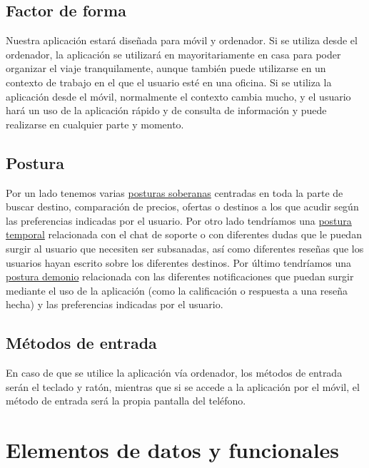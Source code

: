 \subsection{Factor de forma}
Nuestra aplicación estará diseñada para móvil y ordenador. Si se utiliza desde el ordenador, la aplicación se utilizará en mayoritariamente en casa para 
poder organizar el viaje  tranquilamente, aunque también puede utilizarse en un contexto de trabajo en el que el usuario esté en una oficina. Si se utiliza 
la aplicación desde el móvil, normalmente el contexto cambia mucho, y el usuario hará un uso de la aplicación rápido y de consulta de información y puede 
realizarse en cualquier parte y momento.

\subsection{Postura}
Por un lado tenemos varias \underline{posturas soberanas} centradas en toda la parte de buscar destino, comparación de precios, ofertas o destinos a los que acudir 
según las preferencias indicadas por el usuario. Por otro lado tendríamos una \underline{postura temporal} relacionada con el chat de soporte o con diferentes dudas 
que le puedan surgir al usuario que necesiten ser subsanadas, así como diferentes reseñas que los usuarios hayan escrito sobre los diferentes destinos. Por último 
tendríamos una \underline{postura demonio} relacionada con las diferentes notificaciones que puedan surgir mediante el uso de la aplicación (como la calificación o 
respuesta a una reseña hecha) y las preferencias indicadas por el usuario.

\subsection{Métodos de entrada}
En caso de que se utilice la aplicación vía ordenador, los métodos de entrada serán el teclado y ratón, mientras que si se accede a la aplicación por el móvil, 
el método de entrada será la propia pantalla del teléfono.

\section{Elementos de datos y funcionales}

